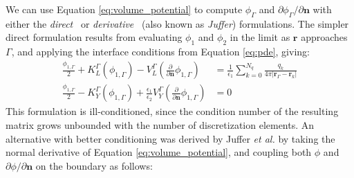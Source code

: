 We can use Equation \eqref{eq:volume_potential} to compute $\phi_\Gamma$ and $\partial\phi_\Gamma/\partial\mathbf{n}$ with either the \emph{direct}~\cite{YoonLenhoff1990} or \emph{derivative}~\cite{JufferETal1991} (also known as \emph{Juffer}) formulations.
The simpler direct formulation results from evaluating $\phi_1$ and $\phi_2$ in the limit as $\mathbf{r}$ approaches $\Gamma$, and applying the interface conditions from Equation \eqref{eq:pde}, giving:
%
\begin{align} \label{eq:direct}
\frac{\phi_{1,\Gamma}}{2}+ K_{L}^{\Gamma}(\phi_{1,\Gamma}) -  V_{L}^{\Gamma} \left(\frac{\partial}{\partial \mathbf{n}}  \phi_{1,\Gamma}  \right) & = \frac{1}{\epsilon_1} \sum_{k=0}^{N_q}  \frac{q_k}{4\pi|\mathbf{r}_{\Gamma} - \mathbf{r}_k|} \nonumber \\
\frac{\phi_{1,\Gamma}}{2} - K_{Y}^{\Gamma}(\phi_{1,\Gamma}) + \frac{\epsilon_1}{\epsilon_2}V_{Y}^{\Gamma} \left( \frac{\partial}{\partial \mathbf{n}} \phi_{1,\Gamma} \right) & = 0
\end{align}
%
This formulation is ill-conditioned, since the condition number of the resulting matrix grows unbounded with the number of discretization elements. 
An alternative with better conditioning was derived by Juffer \emph{et al.} \cite{JufferETal1991} by taking the normal derivative of Equation \eqref{eq:volume_potential}, and coupling both $\phi$ and $\partial\phi/\partial\mathbf{n}$ on the boundary as follows:

